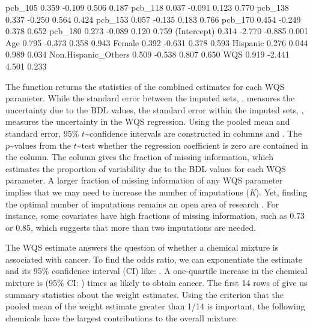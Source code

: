 \begin{Schunk}
\begin{Soutput}
pcb_105                      0.359 -0.109  0.506   0.187
pcb_118                      0.037 -0.091  0.123   0.770
pcb_138                      0.337 -0.250  0.564   0.424
pcb_153                      0.057 -0.135  0.183   0.766
pcb_170                      0.454 -0.249  0.378   0.652
pcb_180                      0.273 -0.089  0.120   0.759
(Intercept)                  0.314 -2.770 -0.885   0.001
Age                          0.795 -0.373  0.358   0.943
Female                       0.392 -0.631  0.378   0.593
Hispanic                     0.276  0.044  0.989   0.034
Non.Hispanic_Others          0.509 -0.538  0.807   0.650
WQS                          0.919 -2.441  4.501   0.233
\end{Soutput}
\end{Schunk}

The  function returns the statistics of the combined
estimates for each WQS parameter. While the standard error between the
imputed sets, , measures the uncertainty due to the BDL
values, the standard error within the imputed sets, ,
measures the uncertainty in the WQS regression. Using the pooled mean
and standard error, 95\% \(t\)\textasciitilde{}confidence intervals are
constructed in columns  and . The
\(p\)\textasciitilde{}values from the \(t\)\textasciitilde{}test whether
the regression coefficient is zero are contained in the 
column. The  column gives the fraction of missing
information, which estimates the proportion of variability due to the
BDL values for each WQS parameter. A larger fraction of missing
information of any WQS parameter implies that we may need to increase
the number of imputations (\emph{K}). Yet, finding the optimal number of
imputations remains an open area of research
\citep{panFractionMissingInformation2016, savaleiObtainingEstimatesFraction2012}.
For instance, some covariates have high fractions of missing
information, such as 0.73 or 0.85, which suggests that more than two
imputations are needed.

The WQS  estimate answers the question of whether a
chemical mixture is associated with cancer. To find the odds ratio, we
can exponentiate the estimate and its 95\% confidence interval (CI)
like: . A one-quartile increase in
the chemical mixture is (95\% CI: ) times as likely to obtain cancer.
The first 14 rows of  give us summary statistics about
the weight estimates. Using the criterion that the pooled mean of the
weight estimate greater than 1/14 is important, the following chemicals
have the largest contributions to the overall mixture.

